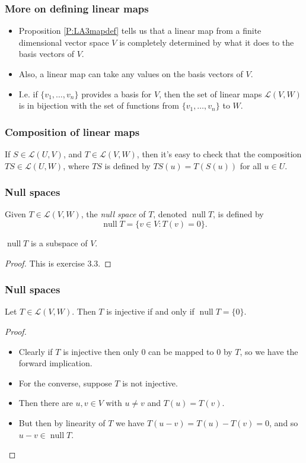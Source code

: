 \documentclass[handout]{beamer}
\newcommand{\cL}{\mathcal{L}}
\DeclareMathOperator{\nul}{\mathrm{null}}
\begin{document}
\begin{frame}
\frametitle{More on defining linear maps}
\begin{itemize}
\item  Proposition \ref{P:LA3mapdef} tells us that a linear map from a finite dimensional vector space $V$ is completely determined by what it does to the basis vectors of $V$. \vspace{0.7cm}
\item Also, a linear map can take any values on the basis vectors of $V$. \vspace{0.7cm}
\item I.e. if $\{v_1,\ldots,v_n\}$ provides a basis for $V$, then the set of linear maps $\cL(V,W)$ is in bijection with the set of functions from $\{v_1,\ldots,v_n\}$ to $W$. 
\end{itemize}
\end{frame}

\begin{frame}
\frametitle{Composition of linear maps}
\begin{definition}
If $S\in \cL(U,V)$, and $T\in\cL(V,W)$, then it's easy to check that the composition $TS\in \cL(U,W)$, where $TS$ is defined by $TS(u) = T(S(u))$ for all $u\in U$.
\end{definition}
\end{frame}

\begin{frame}
\frametitle{Null spaces}
\begin{definition}
Given $T\in\cL(V,W)$, the \emph{null space} of $T$, denoted $\nul T$, is defined by
\[\nul T = \{v\in V: T(v) = 0\}.\]
\end{definition}

\begin{lemma}\label{L:LA3null}
$\nul T$ is a subspace of $V$.
\end{lemma}
\begin{proof}
This is exercise 3.3.
\end{proof}
\end{frame}

\begin{frame}
\frametitle{Null spaces}
\begin{lemma}
Let $T\in\cL(V,W)$. Then $T$ is injective if and only if $\nul T = \{0\}$.
\end{lemma}
\begin{proof}
\begin{itemize}
\item Clearly if $T$ is injective then only $0$ can be mapped to $0$ by $T$, so we have the forward implication.\vspace{0.3cm} 
\item For the converse, suppose $T$ is not injective. \vspace{0.3cm} 
\item Then there are $u,v\in V$ with $u\neq v$ and $T(u)=T(v)$. \vspace{0.3cm} 
\item But then by linearity of $T$ we have $T(u-v) = T(u) - T(v) =0$, and so $u-v\in \nul T$.
\end{itemize}
\end{proof}
\end{frame}
\end{document}

